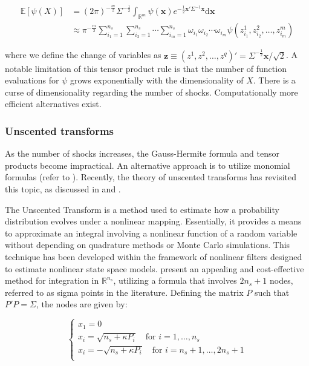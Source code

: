 \documentclass[a4paper,11pt]{amsart}
\begin{document}
\[
   \begin{split}
      \mathbb{E}[\psi(X)] & =(2\pi)^{-\frac{m}{2}} \Sigma^{-\frac{1}{2}} \int_{\mathbb{R}^m} \psi(\mathbf{x}) e^{-\frac{1}{2} \mathbf{x}' \Sigma^{-1} \mathbf{x}} \mathrm{d}\mathbf{x}                             \\
                          & \approx \pi^{-\frac{m}{2}} \sum_{i_1=1}^{n_s} \sum_{i_2=1}^{n_s} \cdots \sum_{i_m=1}^{n_s} \omega_{i_1} \omega_{i_2} \cdots \omega_{i_m} \psi(z_{i_1}^1, z_{i_2}^2, \ldots, z_{i_m}^m)
   \end{split}
\]

where we define the change of variables
as
$\mathbf{z} \equiv (z^1, z^2, \ldots, z^q)' = \Sigma^{-\frac{1}{2}} \mathbf{x} / \sqrt{2}$. A
notable limitation of this tensor product rule is that the number of
function evaluations for $\psi$ grows exponentially with the
dimensionality of $X$. There is a curse of dimensionality regarding
the number of shocks. Computationally more efficient
alternatives exist.\newline


\subsubsection{Unscented transforms}

As the number of shocks increases, the Gauss-Hermite formula and
tensor products become impractical. An alternative approach is to
utilize monomial formulas (refer to \textcite{Stroud1971}). Recently,
the theory of unscented transforms has revisited this topic, as
discussed in \textcite{Julier2000} and \textcite{Julier2002}.\newline

The Unscented Transform is a method used to estimate how a probability
distribution evolves under a nonlinear mapping. Essentially, it
provides a means to approximate an integral involving a nonlinear
function of a random variable without depending on quadrature methods
or Monte Carlo simulations. This technique has been developed within
the framework of nonlinear filters designed to estimate nonlinear
state space models. \textcite{Julier2000} present an appealing and
cost-effective method for integration in $\mathbb{R}^{n_s}$, utilizing
a formula that involves \(2n_s + 1\) nodes, referred to as sigma
points in the literature. Defining the matrix \(P\) such that \(P'P = \Sigma\), the nodes are given by:

\[
   \begin{cases}
      x_1 = 0                                                                  \\
      x_{i} = \sqrt{n_s + \kappa P_i}\quad\text{for }i=1,\dots,n_s             \\
      x_{i} = -\sqrt{n_s + \kappa P_i}\quad\text{for }i=n_s + 1,\dots,2n_s + 1 \\
   \end{cases}
\]
\end{document}
